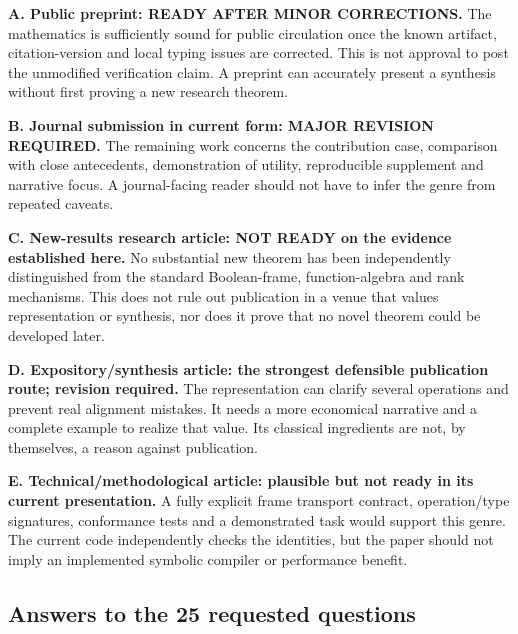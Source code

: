 \documentclass[
  10pt,
]{article}
\begin{document}
\textbf{A. Public preprint: READY AFTER MINOR CORRECTIONS.} The
mathematics is sufficiently sound for public circulation once the known
artifact, citation-version and local typing issues are corrected. This
is not approval to post the unmodified verification claim. A preprint
can accurately present a synthesis without first proving a new research
theorem.

\textbf{B. Journal submission in current form: MAJOR REVISION REQUIRED.}
The remaining work concerns the contribution case, comparison with close
antecedents, demonstration of utility, reproducible supplement and
narrative focus. A journal-facing reader should not have to infer the
genre from repeated caveats.

\textbf{C. New-results research article: NOT READY on the evidence
established here.} No substantial new theorem has been independently
distinguished from the standard Boolean-frame, function-algebra and rank
mechanisms. This does not rule out publication in a venue that values
representation or synthesis, nor does it prove that no novel theorem
could be developed later.

\textbf{D. Expository/synthesis article: the strongest defensible
publication route; revision required.} The representation can clarify
several operations and prevent real alignment mistakes. It needs a more
economical narrative and a complete example to realize that value. Its
classical ingredients are not, by themselves, a reason against
publication.

\textbf{E. Technical/methodological article: plausible but not ready in
its current presentation.} A fully explicit frame transport contract,
operation/type signatures, conformance tests and a demonstrated task
would support this genre. The current code independently checks the
identities, but the paper should not imply an implemented symbolic
compiler or performance benefit.

\subsection{Answers to the 25 requested
questions}\label{answers-to-the-25-requested-questions}
\end{document}
